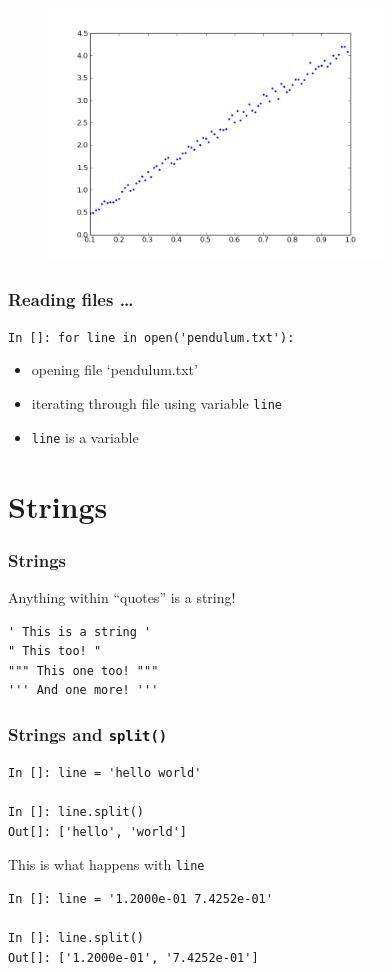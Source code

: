 \documentclass[14pt,compress]{beamer}
\newcommand{\typ}[1]{\lstinline{#1}}
\newcommand{\kwrd}[1]{ \texttt{\textbf{\color{blue}{#1}}}  }
\begin{document}
\begin{frame}[fragile]
\begin{figure}
\includegraphics[width=3.5in]{data/L-Tsq.png}
\end{figure}
\end{frame}

\begin{frame}[fragile]
  \frametitle{Reading files \ldots}
\typ{In []: for line in open('pendulum.txt'):}
\begin{itemize}
\item opening file `pendulum.txt'
\item iterating through file using variable \typ{line}
\item \typ{line} is a \kwrd{string} variable
\end{itemize}
\end{frame}

\section{Strings}
\begin{frame}[fragile]
\frametitle{Strings}
Anything within ``quotes'' is a string!
\begin{lstlisting}
' This is a string '  
" This too! "
""" This one too! """
''' And one more! '''
\end{lstlisting}
\end{frame}

\begin{frame}[fragile]
\frametitle{Strings and \typ{split()}}
  \begin{lstlisting}
In []: line = 'hello world'

In []: line.split()
Out[]: ['hello', 'world']
  \end{lstlisting}
This is what happens with \typ{line}
  \begin{lstlisting}
In []: line = '1.2000e-01 7.4252e-01'

In []: line.split()
Out[]: ['1.2000e-01', '7.4252e-01']
  \end{lstlisting}
\end{frame}
\end{document}
